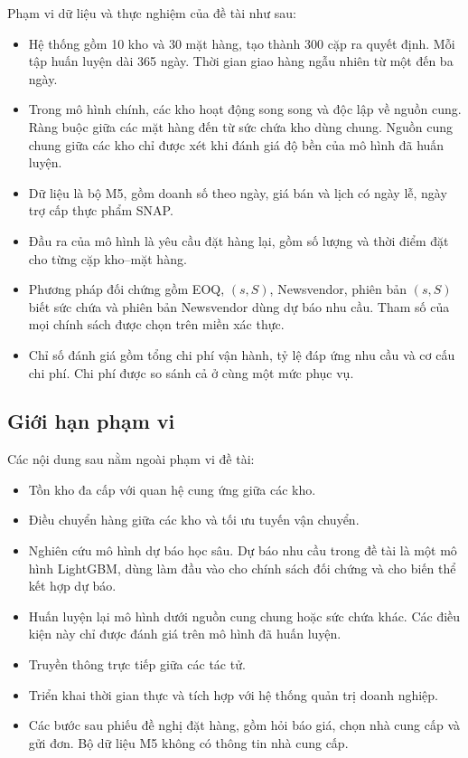 Phạm vi dữ liệu và thực nghiệm của đề tài như sau:
\begin{itemize}
    \item Hệ thống gồm 10 kho và 30 mặt hàng, tạo thành 300 cặp ra quyết định. Mỗi tập huấn luyện dài 365 ngày. Thời gian giao hàng ngẫu nhiên từ một đến ba ngày.
    \item Trong mô hình chính, các kho hoạt động song song và độc lập về nguồn cung. Ràng buộc giữa các mặt hàng đến từ sức chứa kho dùng chung. Nguồn cung chung giữa các kho chỉ được xét khi đánh giá độ bền của mô hình đã huấn luyện.
    \item Dữ liệu là bộ M5, gồm doanh số theo ngày, giá bán và lịch có ngày lễ, ngày trợ cấp thực phẩm SNAP.
    \item Đầu ra của mô hình là yêu cầu đặt hàng lại, gồm số lượng và thời điểm đặt cho từng cặp kho--mặt hàng.
    \item Phương pháp đối chứng gồm EOQ, $(s, S)$, Newsvendor, phiên bản $(s, S)$ biết sức chứa và phiên bản Newsvendor dùng dự báo nhu cầu. Tham số của mọi chính sách được chọn trên miền xác thực.
    \item Chỉ số đánh giá gồm tổng chi phí vận hành, tỷ lệ đáp ứng nhu cầu và cơ cấu chi phí. Chi phí được so sánh cả ở cùng một mức phục vụ.
\end{itemize}

\subsection{Giới hạn phạm vi}
\label{subsec:phamvingoai}

Các nội dung sau nằm ngoài phạm vi đề tài:
\begin{itemize}
    \item Tồn kho đa cấp với quan hệ cung ứng giữa các kho.
    \item Điều chuyển hàng giữa các kho và tối ưu tuyến vận chuyển.
    \item Nghiên cứu mô hình dự báo học sâu. Dự báo nhu cầu trong đề tài là một mô hình LightGBM, dùng làm đầu vào cho chính sách đối chứng và cho biến thể kết hợp dự báo.
    \item Huấn luyện lại mô hình dưới nguồn cung chung hoặc sức chứa khác. Các điều kiện này chỉ được đánh giá trên mô hình đã huấn luyện.
    \item Truyền thông trực tiếp giữa các tác tử.
    \item Triển khai thời gian thực và tích hợp với hệ thống quản trị doanh nghiệp.
    \item Các bước sau phiếu đề nghị đặt hàng, gồm hỏi báo giá, chọn nhà cung cấp và gửi đơn. Bộ dữ liệu M5 không có thông tin nhà cung cấp.
\end{itemize}

